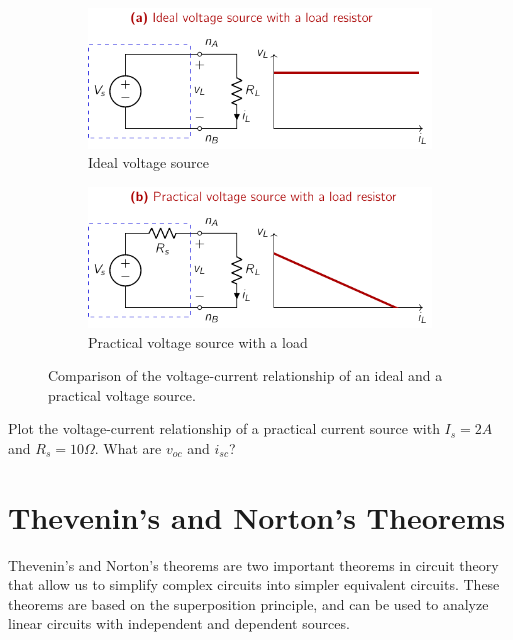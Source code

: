 \begin{figure}[t]
    \centering
    \begin{subfigure}{0.48\textwidth}
        \centering
        \includegraphics[width=\textwidth]{figure/ch02/fig02-04a.pdf}
        \caption{Ideal voltage source}
        \label{fig:02-04a}
    \end{subfigure}
    \hfill
    \begin{subfigure}{0.48\textwidth}
        \centering
        \includegraphics[width=\textwidth]{figure/ch02/fig02-04b.pdf}
        \caption{Practical voltage source with a load}
        \label{fig:02-04b}
    \end{subfigure}
    \caption{Comparison of the voltage-current relationship of an ideal and a practical voltage source.}
    \label{fig:02-04}
\end{figure}

\begin{boxedstuff}
    \begin{problem}
        Plot the voltage-current relationship of a practical current source with $I_s = 2A$ and $R_s = 10\Omega$. What are $v_{oc}$ and $i_{sc}$?
    \end{problem}
\end{boxedstuff}

\section{Thevenin's and Norton's Theorems}
Thevenin's and Norton's theorems are two important theorems in circuit theory that allow us to simplify complex circuits into simpler equivalent circuits. These theorems are based on the superposition principle, and can be used to analyze linear circuits with independent and dependent sources.

